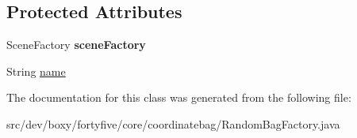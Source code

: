 \subsection*{Protected Attributes}
\begin{DoxyCompactItemize}
\item 
\hypertarget{classdev_1_1boxy_1_1fortyfive_1_1core_1_1coordinatebag_1_1_random_bag_factory_afff76088a6123d7b2e6cbb84773aa276}{
SceneFactory {\bfseries sceneFactory}}
\label{dc/d90/classdev_1_1boxy_1_1fortyfive_1_1core_1_1coordinatebag_1_1_random_bag_factory_afff76088a6123d7b2e6cbb84773aa276}

\item 
String \hyperlink{group___random_bag_gad260363c7a952948df5381eb0bdb784a}{name}
\end{DoxyCompactItemize}


The documentation for this class was generated from the following file:\begin{DoxyCompactItemize}
\item 
src/dev/boxy/fortyfive/core/coordinatebag/RandomBagFactory.java\end{DoxyCompactItemize}
